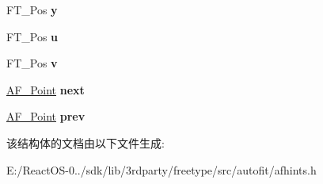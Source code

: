 \begin{DoxyCompactItemize}
F\+T\+\_\+\+Pos {\bfseries y}
\item 
\mbox{\label{struct_a_f___point_rec___ab8c914d28cdef55277140a9c7ff71d2f}} 
F\+T\+\_\+\+Pos {\bfseries u}
\item 
\mbox{\label{struct_a_f___point_rec___abf2ec1063b836a0af242de9ec6b5f892}} 
F\+T\+\_\+\+Pos {\bfseries v}
\item 
\mbox{\label{struct_a_f___point_rec___a645170dd7325b98848313447aeee08fa}} 
\hyperlink{struct_a_f___point_rec__}{A\+F\+\_\+\+Point} {\bfseries next}
\item 
\mbox{\label{struct_a_f___point_rec___a581efa318132490ba5d4f491f71ba3e2}} 
\hyperlink{struct_a_f___point_rec__}{A\+F\+\_\+\+Point} {\bfseries prev}
\end{DoxyCompactItemize}


该结构体的文档由以下文件生成\+:\begin{DoxyCompactItemize}
\item 
E\+:/\+React\+O\+S-\/0../sdk/lib/3rdparty/freetype/src/autofit/afhints.\+h\end{DoxyCompactItemize}
